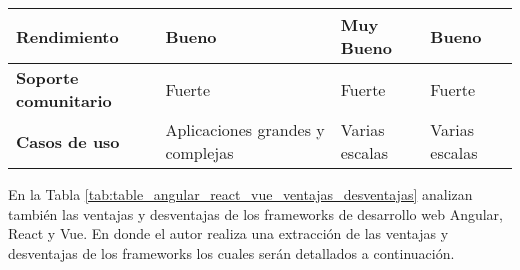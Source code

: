 \begin{footnotesize}
\begin{spacing}{1}
\begin{center}
\begin{longtable}[c]{ |>{\bfseries}p{} |p{} |p{}  |p{}|  }
            \hline
            Rendimiento                                  & Bueno                                & Muy Bueno                           & Bueno                             \\
            \hline
            Soporte comunitario                          & Fuerte                               & Fuerte                              & Fuerte                            \\
            \hline
            Casos de uso                                 & Aplicaciones grandes y complejas     & Varias escalas                      & Varias escalas                    \\
            \hline
        \end{longtable}\label{tab:table_angular_react_vue_caracteristicas}

    \end{center}
\end{spacing}
\end{footnotesize}

En la Tabla \ref{tab:table_angular_react_vue_ventajas_desventajas} analizan también las ventajas y desventajas de los frameworks de desarrollo web Angular, React y Vue.
En donde el autor \cite{wu_desarrollo_2014}  realiza una extracción de las ventajas y desventajas de los frameworks los cuales serán detallados a continuación.

